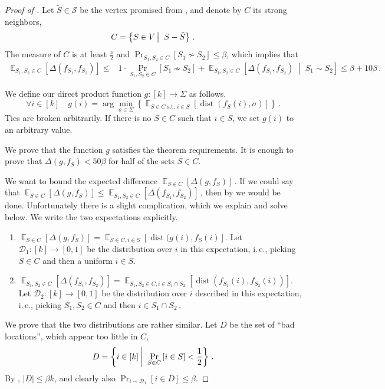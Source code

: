 \documentclass[11pt]{article}
\numberwithin{equation}{section}
\theoremstyle{definition}
\theoremstyle{plain}
\newcommand{\ie}{i.\,e.}
\newcommand{\Prob}[2][]{\Pr_{{#1}}\left[#2\right]} %
\DeclareMathOperator*{\E}{\mathbb{E}} %
\newcommand{\Ex}[2][]{\E_{{#1}}\Brac{#2}} %
\newcommand{\Brac}[1]{\left[#1\right]} %
\newcommand{\abs}[1]{\lvert#1\rvert} %
\newcommand{\given}{\;\middle\vert\;} %
\newcommand\sett[2]{\left\{ #1 \left| \; \vphantom{#1 #2} \right. #2  \right\}} %
\newcommand{\Set}[1]{\left\{#1\right\}} %
\newcommand\f{f} %
\newcommand\setf{f} %
\newcommand\pf{g} %
\DeclareMathOperator{\dist}{dist} %
\newcommand{\diff}{\Delta} %
\newcommand\wconn{\sim} %
\newcommand\sconn{-} %
\begin{document}
\begin{proof}[Proof of ]
	Let $\tilde{S}\in\mathcal{S}$ be the vertex promised from , and denote by $C$ its strong neighbors,
	\[C = \sett{S\in V}{S\sconn \tilde{S}}\,. \] %
	The measure of $C$ is at least $\frac{\nu}{2}$ and $\Pr_{S_1,S_2\in C}[S_1\not\wconn S_2]\leq \beta$, which implies that
	\begin{align}\label{eq:clique-consistency}
	 \Ex[S_1,S_2\in C]{\diff(\setf_{S_1},\setf_{S_2})} \leq& 1\cdot\Prob[S_1,S_2\in C]{S_1\not\wconn S_2} + \Ex[S_1, S_2\in C]{\diff(\setf_{S_1},\setf_{S_2}) \given S_1\wconn S_2}  \leq \beta+10\beta \,.  %
	\end{align}
	
	We define our direct product function $\pf:[k]\rightarrow \Sigma$ as follows. 
	\[ \forall i\in[k] \quad \pf(i) = \arg\min_{\sigma\in\Sigma}\Set{\E_{S\in C \text{ s.t. } i\in S}[\dist(\setf_S(i),\sigma)]  }\,. \] %
	Ties are broken arbitrarily. If there is no $S\in C$ such that $i\in S$, we set $\pf(i)$ to an arbitrary value.
	
    We prove that the function $\pf$ satisfies the theorem requirements. It is enough to prove that $\Delta(\pf,\f_S) < 50\beta$ for half of the sets $S\in C$.
	
We want to bound the expected difference $\E_{S\in C}[\Delta(\pf,\f_S)]$\,.
	If we could say that $\E_{S\in C}[\Delta(\pf,\f_S)] \leq \E_{S_1,S_2\in C}[\Delta(\f_{S_1},\f_{S_2})]$\,, then by  we would be done. Unfortunately there is a slight complication, which we explain and solve below.
	We write the two expectations explicitly.
    \begin{enumerate}
        \item $\E_{S\in C}[\Delta(\pf,\f_S)] = \E_{S\in C, i\in S}[\dist(\pf(i),\f_S(i)].$ Let $\mathcal{D}_1:[k]\rightarrow[0,1]$ be the distribution over $i$ in this expectation, \ie, picking $S\in C$ and then a uniform 
%
$i\in S$.   %
        \item $\E_{S_1,S_2\in C}[\Delta(\f_{S_1},\f_{S_2})] = \E_{S_1,S_2\in C, i\in S_1\cap S_2}[\dist(\f_{S_1}(i),\f_{S_2}(i))].$ Let $\mathcal{D}_2:[k]\rightarrow[0,1]$ be the distribution over $i$ described in this expectation, \ie, picking $S_1, S_2\in C$ and then $i\in S_1\cap S_2\,.$
    \end{enumerate}
	We prove that the two distributions are rather similar.
	Let $D$ be the set of ``bad locations'', which appear too little in $C$,
	\[ D = \sett{i\in [k]}{\Prob[S\in C]{i\in S}< \frac{1}{2}}\,.\] %
	By , $\abs{D}\leq \beta k$, and clearly also $\Pr_{i\sim\mathcal{D}_1}[i\in D]\leq \beta$. 
	

\end{proof}
\end{document}
